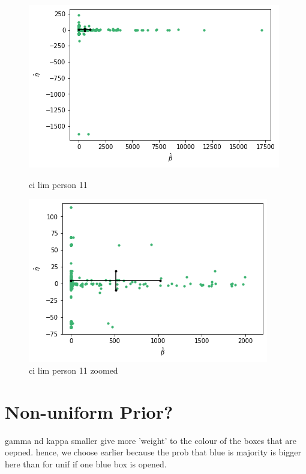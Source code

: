 \begin{figure}
    \centering
    \begin{minipage}{0.48\textwidth}
        \centering
        \includegraphics[scale=0.37]{pictures/ci_lim_b_e_person11.png}
        \caption{ci lim person 11}
        \label{fig:ci_lim_a_e_person_11}
    \end{minipage}\hfill
    \begin{minipage}{0.48\textwidth}
        \centering
        \includegraphics[scale=0.37]{pictures/ci_lim_b_e_person11_zoomed.png}
        \caption{ci lim person 11 zoomed}
        \label{fig:ci_lim_b_e_person_11_zoomed}
    \end{minipage}
\end{figure}


\section{Non-uniform Prior?}
gamma nd kappa smaller give more 'weight' to the colour of the boxes that are oepned. hence, we choose earlier because the prob that blue is majority is bigger here than for unif if one blue box is opened. 